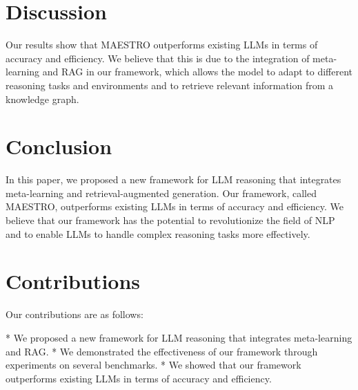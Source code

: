 \documentclass{article}
\begin{document}
\section{Discussion}
Our results show that MAESTRO outperforms existing LLMs in terms of accuracy and efficiency. We believe that this is due to the integration of meta-learning and RAG in our framework, which allows the model to adapt to different reasoning tasks and environments and to retrieve relevant information from a knowledge graph.

\section{Conclusion}
In this paper, we proposed a new framework for LLM reasoning that integrates meta-learning and retrieval-augmented generation. Our framework, called MAESTRO, outperforms existing LLMs in terms of accuracy and efficiency. We believe that our framework has the potential to revolutionize the field of NLP and to enable LLMs to handle complex reasoning tasks more effectively.

\section{Contributions}
Our contributions are as follows:

* We proposed a new framework for LLM reasoning that integrates meta-learning and RAG.
* We demonstrated the effectiveness of our framework through experiments on several benchmarks.
* We showed that our framework outperforms existing LLMs in terms of accuracy and efficiency.
\end{document}
